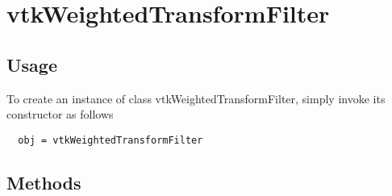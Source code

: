 \section{vtkWeightedTransformFilter}

\subsection{Usage}


To create an instance of class vtkWeightedTransformFilter, simply
invoke its constructor as follows
\begin{verbatim}
  obj = vtkWeightedTransformFilter
\end{verbatim}
\subsection{Methods}

